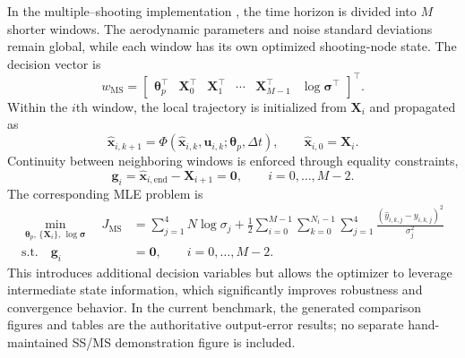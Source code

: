 \documentclass[11pt]{article}
\begin{document}
In the multiple--shooting implementation \cite{bock1984multiple,jategaonkar2006flight}, the time horizon is divided into $M$
shorter windows. The aerodynamic parameters and noise standard deviations remain
global, while each window has its own optimized shooting-node state. The decision
vector is
\[
    w_{\mathrm{MS}}
    =
    \begin{bmatrix}
        \boldsymbol{\theta}_p^\top &
        \mathbf{X}_0^\top &
        \mathbf{X}_1^\top &
        \cdots &
        \mathbf{X}_{M-1}^\top &
        \log\boldsymbol{\sigma}^\top
    \end{bmatrix}^{\!\top}.
\]
Within the $i$th window, the local trajectory is initialized from $\mathbf{X}_i$
and propagated as
\[
    \hat{\mathbf{x}}_{i,k+1}
    =
    \Phi(\hat{\mathbf{x}}_{i,k},\mathbf{u}_{i,k};
    \boldsymbol{\theta}_p,\Delta t),
    \qquad
    \hat{\mathbf{x}}_{i,0}=\mathbf{X}_i.
\]
Continuity between neighboring windows is enforced through equality constraints,
\[
    \mathbf{g}_i
    =
    \hat{\mathbf{x}}_{i,\mathrm{end}}
    -
    \mathbf{X}_{i+1}
    =
    \mathbf{0},
    \qquad i=0,\ldots,M-2.
\]
The corresponding MLE problem is
\[
\begin{aligned}
    \min_{\boldsymbol{\theta}_p,\,\{\mathbf{X}_i\},\,\log\boldsymbol{\sigma}}
    \quad
    J_{\mathrm{MS}}
    &=
    \sum_{j=1}^{4} N\log\sigma_j
    +
    \frac{1}{2}
    \sum_{i=0}^{M-1}
    \sum_{k=0}^{N_i-1}
    \sum_{j=1}^{4}
    \frac{
    \left(\hat{y}_{i,k,j}-y_{i,k,j}\right)^2
    }{\sigma_j^2} \\
    \text{s.t.}\quad
    \mathbf{g}_i &= \mathbf{0},
    \qquad i=0,\ldots,M-2.
\end{aligned}
\]
This introduces additional decision variables but allows the optimizer to leverage intermediate state information, which significantly improves robustness and convergence behavior. In the current benchmark, the generated comparison figures and tables are the authoritative output-error results; no separate hand-maintained SS/MS demonstration figure is included.
\end{document}

